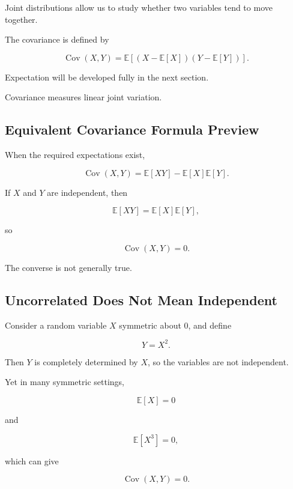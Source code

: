 Joint distributions allow us to study whether two variables tend to move
together.

The covariance is defined by

\[
\boxed{
\operatorname{Cov}(X,Y)
=
\mathbb{E}
\left[
(X-\mathbb{E}[X])
(Y-\mathbb{E}[Y])
\right].
}
\]

Expectation will be developed fully in the next section.

Covariance measures linear joint variation.

\subsection{Equivalent Covariance Formula Preview}
\label{subsec:covariance-equivalent-preview}

When the required expectations exist,

\[
\boxed{
\operatorname{Cov}(X,Y)
=
\mathbb{E}[XY]
-
\mathbb{E}[X]\mathbb{E}[Y].
}
\]

If \(X\) and \(Y\) are independent, then

\[
\mathbb{E}[XY]
=
\mathbb{E}[X]\mathbb{E}[Y],
\]

so

\[
\boxed{
\operatorname{Cov}(X,Y)=0.
}
\]

The converse is not generally true.

\subsection{Uncorrelated Does Not Mean Independent}
\label{subsec:uncorrelated-not-independent}

Consider a random variable \(X\) symmetric about \(0\), and define

\[
Y=X^2.
\]

Then \(Y\) is completely determined by \(X\), so the variables are not
independent.

Yet in many symmetric settings,

\[
\mathbb{E}[X]=0
\]

and

\[
\mathbb{E}[X^3]=0,
\]

which can give

\[
\operatorname{Cov}(X,Y)=0.
\]

